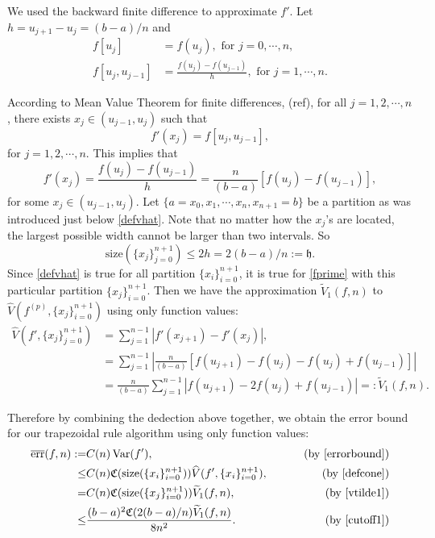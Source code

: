 \documentclass{iitthesis}
\DeclareMathOperator{\Var}{Var}
\theoremstyle{definition}
\theoremstyle{remark}
\begin{document}
We used the backward finite difference to approximate $f'$. Let $h=u_{j+1}-u_{j}=(b-a)/n$ and
\begin{align*}
  f[u_{j}]&=f(u_{j}), \text{ for } j=0,\cdots, n,\\
  f[u_{j},u_{j-1}]&=\frac{f(u_{j})-f(u_{j-1})}{h},\text{ for } j=1, \cdots, n.
\end{align*}


According to Mean Value Theorem for finite differences, (ref), for all $j=1,2,\cdots,n$, there exists $x_j\in (u_{j-1},u_{j})$ such that
\begin{equation*}
   f'(x_j)= f[u_{j},u_{j-1}],
\end{equation*}
for $j = 1, 2, \cdots, n.$ This implies that
\begin{equation}\label{fprime}
  f'(x_j)=\frac{f(u_{j})-f(u_{j-1})}{h}=\frac{n}{(b-a)}[f(u_{j})-f(u_{j-1})],
\end{equation}
for some $x_j\in (u_{j-1},u_{j})$. Let $\{a=x_{0}, x_{1},\cdots,x_{n},x_{n+1}=b\}$ be a partition as was introduced just below \eqref{defvhat}. Note that no matter how the $x_j$'s are located, the largest possible width cannot be larger than two intervals. So 
\begin{equation}\label{cutoff1}
  \text{size}(\{x_j\}_{j=0}^{n+1})\leq 2h=2(b-a)/n:=\mathfrak{h}.
\end{equation}
Since \eqref{defvhat} is true for all partition $\{x_i\}_{i=0}^{n+1}$, it is true for \eqref{fprime} with this particular partition $\{x_j\}_{i=0}^{n+1}$. Then we have the approximation $\widetilde{V}_1(f,n)$ to $\widehat{V}(f^{(p)},\{x_j\}_{i=0}^{n+1})$ using only function values:
\begin{align}\label{vtilde1}
\nonumber    \widehat{V}(f',\{x_j\}_{j=0}^{n+1})&= \sum_{j=1}^{n-1}\left|f'(x_{j+1})-f'(x_{j})\right|,\\
\nonumber    &=\sum_{j=1}^{n-1}\left|\frac{n}{(b-a)}[f(u_{j+1})-f(u_{j})-f(u_{j})+f(u_{j-1})]\right|\\
    &=\frac{n}{(b-a)}\sum_{j=1}^{n-1}\left|f(u_{j+1})-2f(u_{j})+f(u_{j-1})\right|=:\widetilde{V}_1(f,n).
\end{align}

Therefore by combining the dedection above together, we obtain the error bound for our trapezoidal rule algorithm using only function values:
\begin{align}\label{errortrapcone}
\nonumber  \overline{\text{err}}(f,n):=&C(n)\Var(f'),\qquad &\text{ (by \eqref{errorbound})}\\
\nonumber  \leq & C(n)\mathfrak{C}(\text{size}(\{x_i\}_{i=0}^{n+1}))\widehat{V}(f',\{x_i\}_{i=0}^{n+1}), \qquad &\text{ (by \eqref{defcone})}\\
\nonumber  =& C(n)\mathfrak{C}(\text{size}(\{x_j\}_{i=0}^{n+1}))\widetilde{V}_1(f,n), \qquad &\text{ (by \eqref{vtilde1})}\\
  \leq & \frac{(b-a)^2\mathfrak{C}(2(b-a)/n)\widetilde{V}_1(f,n)}{8n^2}.\qquad &\text{ (by \eqref{cutoff1})}
\end{align}
\end{document}
